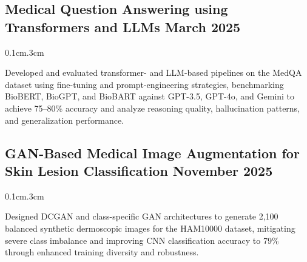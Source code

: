 \subsection{{Medical Question Answering using Transformers and LLMs \hfill March 2025}}
\vspace{-0.2em}
\vspace{0.4em}
\begin{adjustwidth}{0.1cm}{.3cm}
\begin{zitemize}
\item \begin{justify}
Developed and evaluated transformer- and LLM-based pipelines on the MedQA dataset using fine-tuning and prompt-engineering strategies, benchmarking BioBERT, BioGPT, and BioBART against GPT-3.5, GPT-4o, and Gemini to achieve 75–80\% accuracy and analyze reasoning quality, hallucination patterns, and generalization performance.
\end{justify}
\end{zitemize}
\end{adjustwidth}
\vspace{.30em}




\subsection{{GAN-Based Medical Image Augmentation for Skin Lesion Classification \hfill November 2025}}

\begin{adjustwidth}{0.1cm}{.3cm}
\begin{zitemize}
\item 
Designed DCGAN and class-specific GAN architectures to generate 2,100 balanced synthetic dermoscopic images for the HAM10000 dataset, mitigating severe class imbalance and improving CNN classification accuracy to 79\% through enhanced training diversity and robustness.
\end{zitemize}
\end{adjustwidth}
\vspace{.30em}




